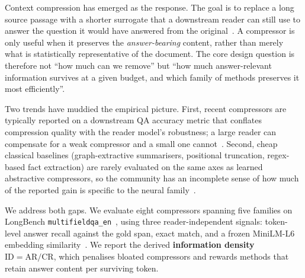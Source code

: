\documentclass[11pt]{article}
\begin{document}
Context compression has emerged as the response. The goal is to replace a
long source passage with a shorter surrogate that a downstream reader
can still use to answer the question it would have answered from the
original~\citep{jiang2023llmlingua,jiang2024longllmlingua,li2023selective,xu2024recomp}.
A compressor is only useful when it preserves the \emph{answer-bearing}
content, rather than merely what is statistically representative of the
document. The core design question is therefore not ``how much can we
remove'' but ``how much answer-relevant information survives at a given
budget, and which family of methods preserves it most efficiently''.

Two trends have muddied the empirical picture. First, recent compressors
are typically reported on a downstream QA accuracy metric that conflates
compression quality with the reader model's robustness; a large reader
can compensate for a weak compressor and a small one
cannot~\citep{chevalier2023autocompressors,ge2024icae,mu2023gisting}.
Second, cheap classical baselines (graph-extractive summarisers,
positional truncation, regex-based fact extraction) are rarely evaluated
on the same axes as learned abstractive compressors, so the community
has an incomplete sense of how much of the reported gain is specific to
the neural family~\citep{erkan2004lexrank,mihalcea2004textrank,lin2004rouge}.

We address both gaps. We evaluate eight compressors spanning five
families on LongBench
\texttt{multifieldqa\_en}~\citep{bai2023longbench},
using three reader-independent signals: token-level answer
recall against the gold span, exact match, and a frozen MiniLM-L6
embedding similarity~\citep{reimers2019sentencebert}. We report the
derived \textbf{information density} $\mathrm{ID} = \mathrm{AR} /
\mathrm{CR}$, which penalises bloated compressors and rewards methods
that retain answer content per surviving token.
\end{document}
